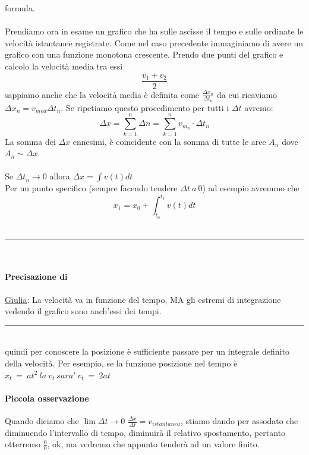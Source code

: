 \documentclass[12pt, a4paper, openany, oneside]{book}
\begin{document}
formula. 
\\ \\ 
Prendiamo ora in esame un grafico che ha sulle ascisse il tempo e sulle ordinate 
le velocità istantanee registrate. Come nel caso precedente immaginiamo di avere 
un grafico con una funzione monotona crescente. Prendo due punti del grafico e
calcolo la velocità media tra essi 
\[\frac{v_{1} + v_{2}}{2}\]
sappiamo anche che la velocità media è definita come $\frac{\Delta x_{n}}{\Delta t_{n}}$
da cui ricaviamo $\Delta x_{n} = v_{med} \Delta t_{n}$.
Se ripetiamo questo procedimento per tutti i $\Delta t$ avremo:
\[\Delta x = \sum_{k=1}^n \Delta n = \sum_{k=1}^n v_{m_{n}} \cdot \Delta t_{n}\]
La somma dei $\Delta x$ ennesimi, è coincidente con la somma di tutte le aree
$A_{n}$ dove $A_{n} \sim \Delta x$. \\ \\
Se $\Delta t_{n} \to 0$ allora $\Delta x = \int v(t) dt$ \\
Per un punto specifico (sempre facendo tendere $\Delta t ~ a ~ 0$) ad esempio avremmo che 
\[x_{1} = x_{0} + \int_{t_{0}}^{t_{1}} v(t) dt \]
\\
{\color{black} \rule{\linewidth}{0.mm} }
\\
\paragraph{Precisazione di } \href{https://github.com/LiaBell47}{Giulia}:
La velocità va in funzione del tempo, MA gli estremi di integrazione vedendo il
grafico sono anch'essi dei tempi.
\\
{\color{black} \rule{\linewidth}{0.mm} }
\\
quindi per conoscere la posizione è sufficiente passare per un integrale definito della velocità.
Per esempio, se la funzione posizione nel tempo è $x_{t} ~ = ~ at^2 ~ la ~ v_{t}
~ sara' ~ v_{t} ~ =~  2at$
\paragraph{Piccola osservazione} Quando diciamo che $\lim{\Delta t \to 0}$ 
$\frac{\Delta x}{\Delta t} = v_{istantanea}$, stiamo dando per assodato che
diminuendo l'intervallo di tempo, diminuirà il relativo spostamento, pertanto
otterremo $\frac{0}{0}$, ok, ma vedremo che appunto tenderà ad un valore finito.
\end{document}
